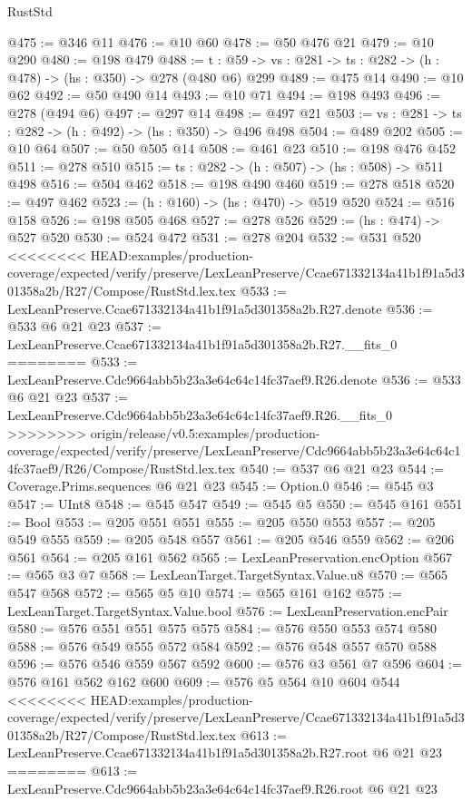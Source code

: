 \begin{lexlean}{RustStd}
\begin{coremodule}
{\begin{coremodule}
@475 := @346 @11
@476 := @10 @60
@478 := @50 @476 @21
@479 := @10 @290
@480 := @198 @479
@488 := {t : @59} -> {vs : @281} -> {ts : @282} -> (h : @478) -> (hs : @350) -> @278 (@480 @6) @299
@489 := @475 @14
@490 := @10 @62
@492 := @50 @490 @14
@493 := @10 @71
@494 := @198 @493
@496 := @278 (@494 @6)
@497 := @297 @14
@498 := @497 @21
@503 := {vs : @281} -> {ts : @282} -> (h : @492) -> (hs : @350) -> @496 @498
@504 := @489 @202
@505 := @10 @64
@507 := @50 @505 @14
@508 := @461 @23
@510 := @198 @476 @452
@511 := @278 @510
@515 := {ts : @282} -> (h : @507) -> (hs : @508) -> @511 @498
@516 := @504 @462
@518 := @198 @490 @460
@519 := @278 @518
@520 := @497 @462
@523 := (h : @160) -> (hs : @470) -> @519 @520
@524 := @516 @158
@526 := @198 @505 @468
@527 := @278 @526
@529 := (hs : @474) -> @527 @520
@530 := @524 @472
@531 := @278 @204
@532 := @531 @520
<<<<<<<< HEAD:examples/production-coverage/expected/verify/preserve/LexLeanPreserve/Ccae671332134a41b1f91a5d301358a2b/R27/Compose/RustStd.lex.tex
@533 := LexLeanPreserve.Ccae671332134a41b1f91a5d301358a2b.R27.denote
@536 := @533 @6 @21 @23
@537 := LexLeanPreserve.Ccae671332134a41b1f91a5d301358a2b.R27.__fits_0
========
@533 := LexLeanPreserve.Cdc9664abb5b23a3e64c64c14fc37aef9.R26.denote
@536 := @533 @6 @21 @23
@537 := LexLeanPreserve.Cdc9664abb5b23a3e64c64c14fc37aef9.R26.__fits_0
>>>>>>>> origin/release/v0.5:examples/production-coverage/expected/verify/preserve/LexLeanPreserve/Cdc9664abb5b23a3e64c64c14fc37aef9/R26/Compose/RustStd.lex.tex
@540 := @537 @6 @21 @23
@544 := Coverage.Prims.sequences @6 @21 @23
@545 := Option.{0}
@546 := @545 @3
@547 := UInt8
@548 := @545 @547
@549 := @545 @5
@550 := @545 @161
@551 := Bool
@553 := @205 @551 @551
@555 := @205 @550 @553
@557 := @205 @549 @555
@559 := @205 @548 @557
@561 := @205 @546 @559
@562 := @206 @561
@564 := @205 @161 @562
@565 := LexLeanPreservation.encOption
@567 := @565 @3 @7
@568 := LexLeanTarget.TargetSyntax.Value.u8
@570 := @565 @547 @568
@572 := @565 @5 @10
@574 := @565 @161 @162
@575 := LexLeanTarget.TargetSyntax.Value.bool
@576 := LexLeanPreservation.encPair
@580 := @576 @551 @551 @575 @575
@584 := @576 @550 @553 @574 @580
@588 := @576 @549 @555 @572 @584
@592 := @576 @548 @557 @570 @588
@596 := @576 @546 @559 @567 @592
@600 := @576 @3 @561 @7 @596
@604 := @576 @161 @562 @162 @600
@609 := @576 @5 @564 @10 @604 @544
<<<<<<<< HEAD:examples/production-coverage/expected/verify/preserve/LexLeanPreserve/Ccae671332134a41b1f91a5d301358a2b/R27/Compose/RustStd.lex.tex
@613 := LexLeanPreserve.Ccae671332134a41b1f91a5d301358a2b.R27.root @6 @21 @23
========
@613 := LexLeanPreserve.Cdc9664abb5b23a3e64c64c14fc37aef9.R26.root @6 @21 @23

\end{coremodule}}
\end{coremodule}
\end{lexlean}
